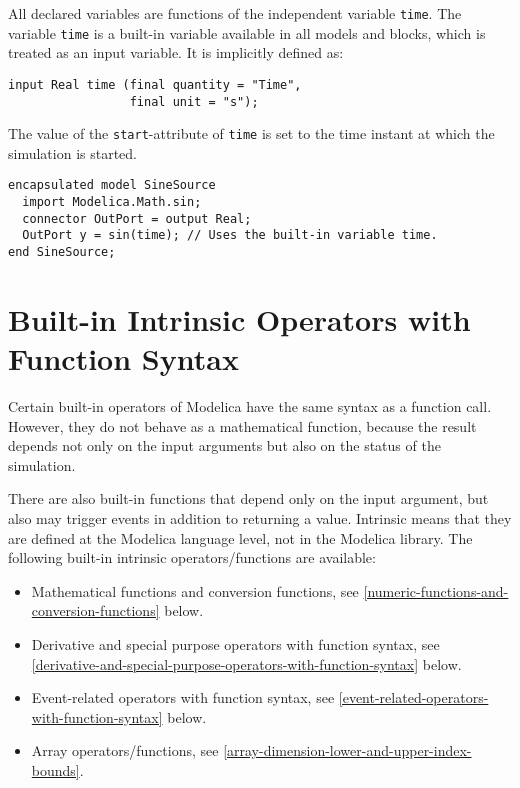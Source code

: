 All declared variables are functions of the independent variable \lstinline!time!.
The variable \lstinline!time! is a built-in variable available in all models and blocks, which is treated as an input variable.
It is implicitly defined as:
\begin{lstlisting}[language=modelica]
input Real time (final quantity = "Time",
                 final unit = "s");
\end{lstlisting}

The value of the \lstinline!start!-attribute of \lstinline!time! is set to the time instant at which the simulation is started.

\begin{example}
\begin{lstlisting}[language=modelica]
encapsulated model SineSource
  import Modelica.Math.sin;
  connector OutPort = output Real;
  OutPort y = sin(time); // Uses the built-in variable time.
end SineSource;
\end{lstlisting}
\end{example}

\section{Built-in Intrinsic Operators with Function Syntax}\label{built-in-intrinsic-operators-with-function-syntax}

Certain built-in operators of Modelica have the same syntax as a function call.
However, they do not behave as a mathematical function, because the result depends not only on the input arguments but also on the status of the simulation.

There are also built-in functions that depend only on the input argument, but also may trigger events in addition to returning a value.
Intrinsic means that they are defined at the Modelica language level, not in the Modelica library.
The following built-in intrinsic operators/functions are available:
\begin{itemize}
\item
  Mathematical functions and conversion functions, see \cref{numeric-functions-and-conversion-functions} below.
\item
  Derivative and special purpose operators with function syntax, see \cref{derivative-and-special-purpose-operators-with-function-syntax} below.
\item
  Event-related operators with function syntax, see \cref{event-related-operators-with-function-syntax} below.
\item
  Array operators/functions, see \cref{array-dimension-lower-and-upper-index-bounds}.
\end{itemize}

